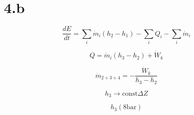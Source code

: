 \section*{4.b}

\[
\frac{dE}{dt} = \sum_i \dot{m}_i (h_{2} - h_{1}) - \sum_i Q_i - \sum_i \dot{m}_i
\]

\[
Q = \dot{m}_i (h_{3} - h_{2}) + \dot{W}_k
\]

\[
\dot{m}_{2+3+4} = -\frac{\dot{W}_k}{h_{3} - h_{2}}
\]

\[
h_{3} \rightarrow \text{const} \Delta Z
\]

\[
h_{3} (8 \text{bar})
\]